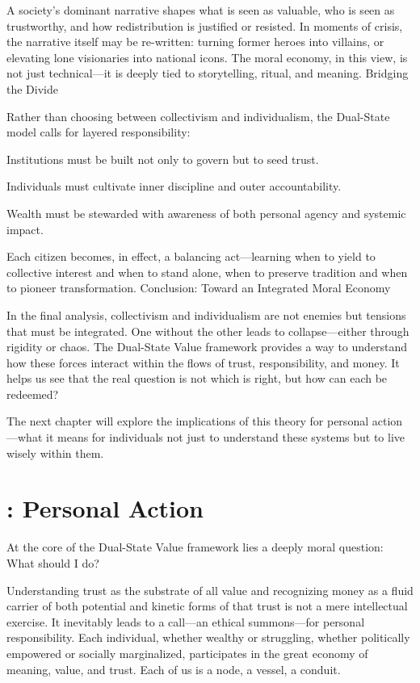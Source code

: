 \documentclass[11pt,oneside]{book}
\begin{document}
A society’s dominant narrative shapes what is seen as valuable, who is seen as trustworthy, and how redistribution is justified or resisted. In moments of crisis, the narrative itself may be re-written: turning former heroes into villains, or elevating lone visionaries into national icons. The moral economy, in this view, is not just technical—it is deeply tied to storytelling, ritual, and meaning.
Bridging the Divide

Rather than choosing between collectivism and individualism, the Dual-State model calls for layered responsibility:

    Institutions must be built not only to govern but to seed trust.

    Individuals must cultivate inner discipline and outer accountability.

    Wealth must be stewarded with awareness of both personal agency and systemic impact.

Each citizen becomes, in effect, a balancing act—learning when to yield to collective interest and when to stand alone, when to preserve tradition and when to pioneer transformation.
Conclusion: Toward an Integrated Moral Economy

In the final analysis, collectivism and individualism are not enemies but tensions that must be integrated. One without the other leads to collapse—either through rigidity or chaos. The Dual-State Value framework provides a way to understand how these forces interact within the flows of trust, responsibility, and money. It helps us see that the real question is not which is right, but how can each be redeemed?

The next chapter will explore the implications of this theory for personal action—what it means for individuals not just to understand these systems but to live wisely within them.




\chapter{: Personal Action}

At the core of the Dual-State Value framework lies a deeply moral question: What should I do?

Understanding trust as the substrate of all value and recognizing money as a fluid carrier of both potential and kinetic forms of that trust is not a mere intellectual exercise. It inevitably leads to a call—an ethical summons—for personal responsibility. Each individual, whether wealthy or struggling, whether politically empowered or socially marginalized, participates in the great economy of meaning, value, and trust. Each of us is a node, a vessel, a conduit.
\end{document}
